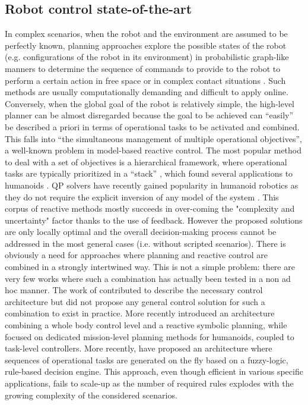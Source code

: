 \documentclass[final,5p,twocolumn]{elsarticle}
\begin{document}
\subsection{Robot control state-of-the-art}
In complex scenarios, when the robot and the environment are assumed to be perfectly known, planning approaches explore the possible states of the robot (e.g. configurations of the robot in its environment) in probabilistic graph-like manners \cite{LaValle2006} to determine the sequence of commands to provide to the robot to perform a certain action in free space \cite{Dalibard2009} \cite{Kuffner2001} or in complex contact situations \cite{Bouyarmane2009} \cite{Bouyarmane2011}. Such methods are usually computationally demanding and difficult to apply online. Conversely, when the global goal of the robot is relatively simple, the high-level planner can be almost disregarded because the goal to be achieved can ``easily'' be described a priori in terms of operational tasks \cite{Khatib1986} to be activated and combined. This falls into ``the simultaneous management of multiple operational objectives'', a well-known problem in model-based reactive control. The most popular method to deal with a set of objectives is a hierarchical framework, where operational tasks are typically prioritized in a ``stack'' \cite{Mansard2007}, which found several applications to humanoids \cite{Sentis2010} \cite{Mistry2011}. QP solvers have recently gained popularity in humanoid robotics as they do not require the explicit inversion of any model of the system \cite{abe2007} \cite{colette2008} \cite{Escande2010} \cite{Salini2011}. This corpus of reactive methods mostly succeeds in over-coming the "complexity and uncertainty" factor thanks to the use of feedback. However the proposed solutions are only locally optimal and the overall decision-making process cannot be addressed in the most general cases (i.e. without scripted scenarios). There is obviously a need for approaches where planning and reactive control are combined in a strongly intertwined way. This is not a simple problem: there are very few works where such a combination has actually been tested in a non ad hoc manner. The work of \cite{Alami1997} contributed to describe the necessary control architecture but did not propose any general control solution for such a combination to exist in practice. More recently \cite{PhilippsenRolandandNejatiNeginandSentis2009} introduced an architecture combining a whole body control level and a reactive symbolic planning, while \cite{yoshida2005} focused on dedicated mission-level planning methods for humanoids, coupled to task-level controllers. More recently, \cite{Salini2011} \cite{salini2011b} have proposed an architecture where sequences of operational tasks are generated on the fly based on a fuzzy-logic, rule-based decision engine. This approach, even though efficient in various specific applications, fails to scale-up as the number of required rules explodes with the growing complexity of the considered scenarios.
\end{document}
